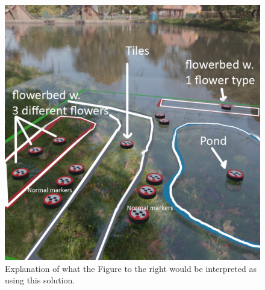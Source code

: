 \begin{figure}[H]
\begin{minipage}[b]{0.49\textwidth}
		\includegraphics[width=1.0\linewidth]{figure/Evaluation/futuremarkerslegend.png}
		\caption{Explanation of what the Figure to the right would be interpreted as using this solution.}
		\label{fig:ftrmarkerslegend}
	\end{minipage}
\end{figure}

